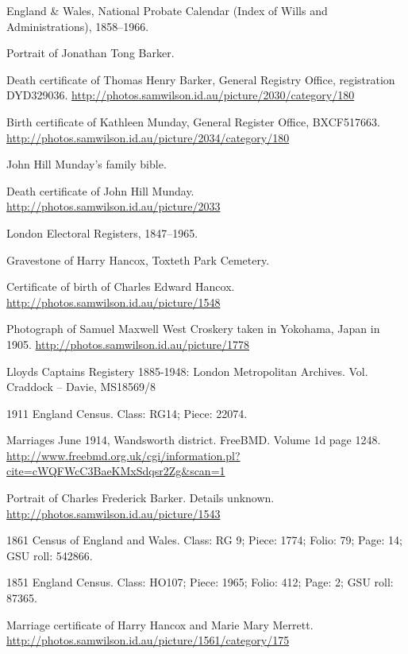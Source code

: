 \begin{thebibliography}{99}
	England \& Wales, National Probate Calendar (Index of Wills and Administrations), 1858--1966.

	Portrait of Jonathan Tong Barker. \url{}

	Death certificate of Thomas Henry Barker, General Registry Office, registration DYD329036.
	\url{http://photos.samwilson.id.au/picture/2030/category/180}

	Birth certificate of Kathleen Munday, General Register Office, BXCF517663.
	\url{http://photos.samwilson.id.au/picture/2034/category/180}

	John Hill Munday's family bible.

	Death certificate of John Hill Munday.
	\url{http://photos.samwilson.id.au/picture/2033}

	London Electoral Registers, 1847--1965.

	Gravestone of Harry Hancox, Toxteth Park Cemetery.

	Certificate of birth of Charles Edward Hancox. \url{http://photos.samwilson.id.au/picture/1548}

	Photograph of Samuel Maxwell West Croskery taken in Yokohama, Japan in 1905.
	\url{http://photos.samwilson.id.au/picture/1778}

	Lloyds Captains Registery 1885-1948: London Metropolitan Archives. Vol. Craddock -- Davie, MS18569/8

	1911 England Census. Class: RG14; Piece: 22074.

	Marriages June 1914, Wandsworth district. FreeBMD. Volume 1d page 1248.
	\url{http://www.freebmd.org.uk/cgi/information.pl?cite=cWQFWcC3BaeKMxSdqsr2Zg&scan=1}

	Portrait of Charles Frederick Barker. Details unknown.
	\url{http://photos.samwilson.id.au/picture/1543}

	1861 Census of England and Wales.
	Class: RG 9; Piece: 1774; Folio: 79; Page: 14; GSU roll: 542866.

	1851 England Census.
	Class: HO107; Piece: 1965; Folio: 412; Page: 2; GSU roll: 87365.

	Marriage certificate of Harry Hancox and Marie Mary Merrett.
	\url{http://photos.samwilson.id.au/picture/1561/category/175}


\end{thebibliography}
